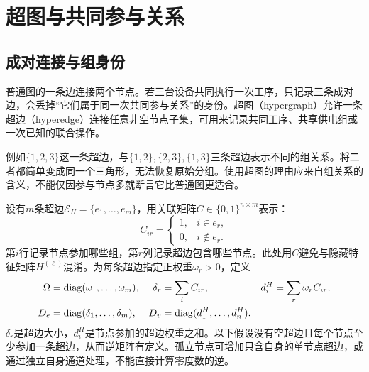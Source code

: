 \section{超图与共同参与关系}
\subsection{成对连接与组身份}
普通图的一条边连接两个节点。若三台设备共同执行一次工序，只记录三条成对边，会丢掉“它们属于同一次共同参与关系”的身份。超图（hypergraph）允许一条超边（hyperedge）连接任意非空节点子集，可用来记录共同工序、共享供电组或一次已知的联合操作。

例如$\{1,2,3\}$这一条超边，与$\{1,2\},\{2,3\},\{1,3\}$三条超边表示不同的组关系。将二者都简单变成同一个三角形，无法恢复原始分组。使用超图的理由应来自组关系的含义，不能仅因参与节点多就断言它比普通图更适合。

设有$m$条超边$\mathcal E_H=\{e_1,\ldots,e_m\}$，用关联矩阵$C\in\{0,1\}^{n\times m}$表示：
\begin{equation}
 C_{ir}=\begin{cases}1,&i\in e_r,\\0,&i\notin e_r.\end{cases}
 \label{eq:graph-hyper-incidence}
\end{equation}
第$i$行记录节点参加哪些组，第$r$列记录超边包含哪些节点。此处用$C$避免与隐藏特征矩阵$H^{(\ell)}$混淆。为每条超边指定正权重$\omega_r>0$，定义
\begin{equation}
 \begin{aligned}
 \Omega&=\operatorname{diag}(\omega_1,\ldots,\omega_m),&
 \delta_r&=\sum_iC_{ir},&
 d_i^H&=\sum_r\omega_rC_{ir},\\
 D_e&=\operatorname{diag}(\delta_1,\ldots,\delta_m),&
 D_v&=\operatorname{diag}(d_1^H,\ldots,d_n^H).
 \end{aligned}
 \label{eq:graph-hyper-degrees}
\end{equation}
$\delta_r$是超边大小，$d_i^H$是节点参加的超边权重之和。以下假设没有空超边且每个节点至少参加一条超边，从而逆矩阵有定义。孤立节点可增加只含自身的单节点超边，或通过独立自身通道处理，不能直接计算零度数的逆。

